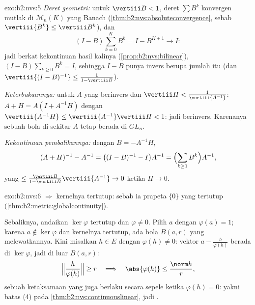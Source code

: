 \begin{solution}{exo:b2:nvs:5}
\emph{Deret geometri:} untuk $\vertiii B < 1$, deret $\sum
B^k$ konvergen mutlak di $\mathcal{M}_n(K)$ yang Banach
(\cref{thm:b2:nvs:absoluteconvergence}, sebab $\vertiii{B^k} \leq
\vertiii B^k$), dan
\[
(I - B)\sum_{k=0}^{K} B^k = I - B^{K+1} \longrightarrow I :
\]
jadi berkat kekontinuan hasil kalinya
(\cref{prop:b2:nvs:bilinear}), $(I - B)\sum_{k\geq0} B^k = I$, sehingga
$I - B$ punya invers berupa jumlah itu (dan
$\vertiii{(I-B)^{-1}} \leq \frac{1}{1 - \vertiii B}$).

\emph{Keterbukaannya:} untuk $A$ yang berinvers dan $\vertiii H <
\frac{1}{\vertiii{A^{-1}}}$: $A + H = A(I + A^{-1}H)$ dengan
$\vertiii{A^{-1}H} \leq \vertiii{A^{-1}}\vertiii H < 1$: jadi berinvers.
Karenanya sebuah bola di sekitar $A$ tetap berada di $GL_n$.

\emph{Kekontinuan pembalikannya:} dengan $B = -A^{-1}H$,
\[
(A + H)^{-1} - A^{-1} = \bigl((I - B)^{-1} - I\bigr)A^{-1}
= \Bigl(\sum_{k \geq 1} B^k\Bigr) A^{-1},
\]
yang  $\leq \frac{\vertiii B}{1 - \vertiii B}\vertiii{A^{-1}}
\to 0$ ketika $H \to 0$.
\end{solution}

\begin{solution}{exo:b2:nvs:6}
 $\Rightarrow$ kernelnya tertutup: sebab ia prapeta $\{0\}$ yang
tertutup (\cref{thm:b2:metric:globalcontinuity}).

Sebaliknya, andaikan $\ker\varphi$ tertutup dan $\varphi \neq 0$. Pilih
$a$ dengan $\varphi(a) = 1$; karena $a \notin \ker\varphi$ dan
kernelnya tertutup, ada bola $B(a, r)$ yang melewatkannya. Kini misalkan
$h \in E$ dengan $\varphi(h) \neq 0$: vektor $a - \frac{h}{\varphi(h)}$
berada di $\ker\varphi$, jadi di luar $B(a, r)$:
\[
\Bigl\Vert \frac{h}{\varphi(h)} \Bigr\Vert \geq r
\quad\Longrightarrow\quad
\abs{\varphi(h)} \leq \frac{\norm h}{r},
\]
sebuah ketaksamaan yang juga berlaku secara sepele ketika $\varphi(h) =
0$: yakni batas (4) pada \cref{thm:b2:nvs:continuouslinear}, jadi .
\end{solution}

